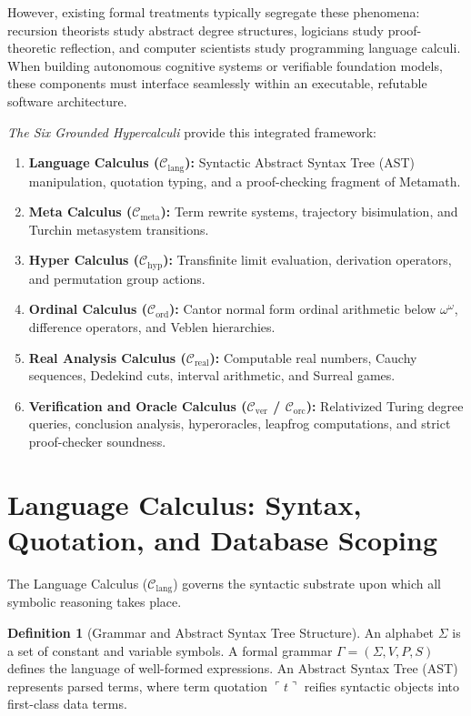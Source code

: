\documentclass[11pt]{article}
\theoremstyle{definition}
\newtheorem{definition}[theorem]{Definition}
\newcommand{\code}[1]{\ulcorner #1\urcorner}
\begin{document}
However, existing formal treatments typically segregate these phenomena: recursion theorists study abstract degree structures, logicians study proof-theoretic reflection, and computer scientists study programming language calculi. When building autonomous cognitive systems or verifiable foundation models, these components must interface seamlessly within an executable, refutable software architecture.

\emph{The Six Grounded Hypercalculi} provide this integrated framework:
\begin{enumerate}
\item \textbf{Language Calculus ($\mathcal{C}_{\mathrm{lang}}$):} Syntactic Abstract Syntax Tree (AST) manipulation, quotation typing, and a proof-checking fragment of Metamath.
\item \textbf{Meta Calculus ($\mathcal{C}_{\mathrm{meta}}$):} Term rewrite systems, trajectory bisimulation, and Turchin metasystem transitions.
\item \textbf{Hyper Calculus ($\mathcal{C}_{\mathrm{hyp}}$):} Transfinite limit evaluation, derivation operators, and permutation group actions.
\item \textbf{Ordinal Calculus ($\mathcal{C}_{\mathrm{ord}}$):} Cantor normal form ordinal arithmetic below $\omega^\omega$, difference operators, and Veblen hierarchies.
\item \textbf{Real Analysis Calculus ($\mathcal{C}_{\mathrm{real}}$):} Computable real numbers, Cauchy sequences, Dedekind cuts, interval arithmetic, and Surreal games.
\item \textbf{Verification and Oracle Calculus ($\mathcal{C}_{\mathrm{ver}}$ / $\mathcal{C}_{\mathrm{orc}}$):} Relativized Turing degree queries, conclusion analysis, hyperoracles, leapfrog computations, and strict proof-checker soundness.
\end{enumerate}

\section{Language Calculus: Syntax, Quotation, and Database Scoping}
The Language Calculus ($\mathcal{C}_{\mathrm{lang}}$) governs the syntactic substrate upon which all symbolic reasoning takes place.

\begin{definition}[Grammar and Abstract Syntax Tree Structure]
An alphabet $\Sigma$ is a set of constant and variable symbols. A formal grammar $\Gamma = (\Sigma, V, P, S)$ defines the language of well-formed expressions. An Abstract Syntax Tree (AST) represents parsed terms, where term quotation $\code{t}$ reifies syntactic objects into first-class data terms.
\end{definition}
\end{document}
